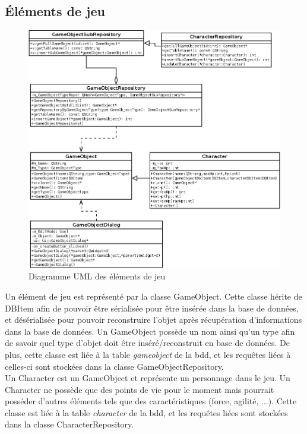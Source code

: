 \subsection{Éléments de jeu}


\begin{figure}[h!]
        \centering
        \includegraphics[width=\textwidth]{img/gameobject_uml.png}
        \caption{Diagramme UML des éléments de jeu}
\end{figure}

Un élément de jeu est représenté par la classe GameObject. Cette classe hérite de DBItem afin de pouvoir être sérialisée pour être insérée dans la base de données, et désérialisée pour pouvoir reconstruire l'objet après récupération d'informations dans la base de données. Un GameObject possède un nom ainsi qu'un type afin de savoir quel type d'objet doit être inséré/reconstruit en base de données. De plus, cette classe est liée à la table \emph{gameobject} de la bdd, et les requêtes liées à celles-ci sont stockées dans la classe GameObjectRepository.\\

Un Character est un GameObject et représente un personnage dans le jeu. Un Character ne possède que des points de vie pour le moment mais pourrait posséder d'autres éléments tels que des caractéristiques (force, agilité, ...). Cette classe est liée à la table \emph{character} de la bdd, et les requêtes liées sont stockées dans la classe CharacterRepository.\\

